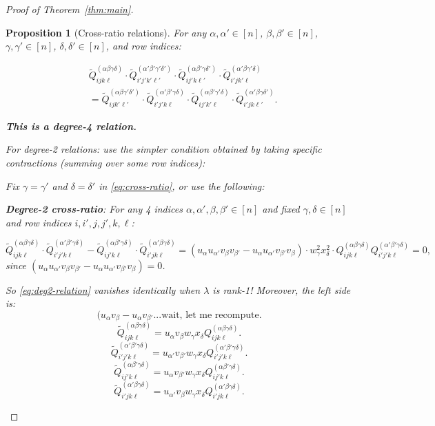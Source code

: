 \documentclass[12pt]{article}
\newtheorem{proposition}{Proposition}
\theoremstyle{definition}
\begin{document}
\begin{proof}[Proof of Theorem~\ref{thm:main}]
\begin{proposition}[Cross-ratio relations]
For any $\alpha,\alpha'\in[n]$, $\beta,\beta'\in[n]$, $\gamma,\gamma'\in[n]$, $\delta,\delta'\in[n]$, and row indices:

\begin{align}\label{eq:cross-ratio}
&\tilde{Q}^{(\alpha\beta\gamma\delta)}_{ijk\ell}\cdot\tilde{Q}^{(\alpha'\beta'\gamma'\delta')}_{i'j'k'\ell'}\cdot\tilde{Q}^{(\alpha\beta'\gamma\delta')}_{ij'k\ell'}\cdot\tilde{Q}^{(\alpha'\beta\gamma'\delta)}_{i'jk'\ell}\nonumber\\
&= \tilde{Q}^{(\alpha\beta\gamma'\delta')}_{ijk'\ell'}\cdot\tilde{Q}^{(\alpha'\beta'\gamma\delta)}_{i'j'k\ell}\cdot\tilde{Q}^{(\alpha\beta'\gamma'\delta)}_{ij'k'\ell}\cdot\tilde{Q}^{(\alpha'\beta\gamma\delta')}_{i'jk\ell'}.
\end{align}

\textbf{This is a degree-4 relation.}

For degree-2 relations: use the simpler condition obtained by taking specific contractions (summing over some row indices):

Fix $\gamma = \gamma'$ and $\delta = \delta'$ in \eqref{eq:cross-ratio}, or use the following:

\textbf{Degree-2 cross-ratio}: For any 4 indices $\alpha,\alpha',\beta,\beta'\in[n]$ and fixed $\gamma,\delta\in[n]$ and row indices $i,i',j,j',k,\ell$:

\begin{equation}\label{eq:deg2-relation}
\tilde{Q}^{(\alpha\beta\gamma\delta)}_{ijk\ell}\cdot\tilde{Q}^{(\alpha'\beta'\gamma\delta)}_{i'j'k\ell} - \tilde{Q}^{(\alpha\beta'\gamma\delta)}_{ij'k\ell}\cdot\tilde{Q}^{(\alpha'\beta\gamma\delta)}_{i'jk\ell} = (u_\alpha u_{\alpha'}v_\beta v_{\beta'} - u_\alpha u_{\alpha'}v_{\beta'}v_\beta)\cdot w_\gamma^2 x_\delta^2\cdot Q^{(\alpha\beta\gamma\delta)}_{ijk\ell}Q^{(\alpha'\beta'\gamma\delta)}_{i'j'k\ell} = 0,
\end{equation}
since $(u_\alpha u_{\alpha'}v_\beta v_{\beta'} - u_\alpha u_{\alpha'}v_{\beta'}v_\beta) = 0$.

So \eqref{eq:deg2-relation} vanishes identically when $\lambda$ is rank-1! Moreover, the left side is:
$$(u_\alpha v_\beta - u_{\alpha}v_{\beta'}... \text{wait, let me recompute.}$$
$$\tilde{Q}^{(\alpha\beta\gamma\delta)}_{ijk\ell} = u_\alpha v_\beta w_\gamma x_\delta Q^{(\alpha\beta\gamma\delta)}_{ijk\ell}.$$
$$\tilde{Q}^{(\alpha'\beta'\gamma\delta)}_{i'j'k\ell} = u_{\alpha'}v_{\beta'}w_\gamma x_\delta Q^{(\alpha'\beta'\gamma\delta)}_{i'j'k\ell}.$$
$$\tilde{Q}^{(\alpha\beta'\gamma\delta)}_{ij'k\ell} = u_\alpha v_{\beta'}w_\gamma x_\delta Q^{(\alpha\beta'\gamma\delta)}_{ij'k\ell}.$$
$$\tilde{Q}^{(\alpha'\beta\gamma\delta)}_{i'jk\ell} = u_{\alpha'}v_\beta w_\gamma x_\delta Q^{(\alpha'\beta\gamma\delta)}_{i'jk\ell}.$$


\end{proposition}
\end{proof}
\end{document}
